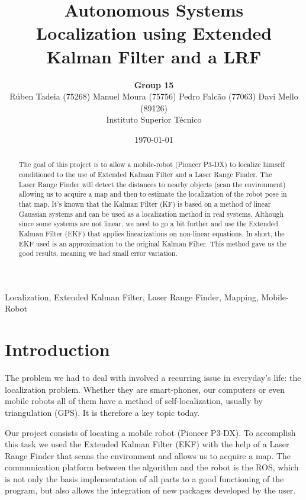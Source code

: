 \documentclass[a4paper]{IEEEtran}
\title{{\normalsize Autonomous Systems} \\
Localization using Extended Kalman Filter and a LRF}
\author{
        \textbf{Group 15}\\
        R\'{u}ben Tadeia (75268)
        \quad
        Manuel Moura (75756)
        \quad
        Pedro Falcão (77063)
        \quad
        Davi Mello (89126) \\
        Instituto Superior T\'{e}cnico}
\date{\today}
\begin{document}
\maketitle
{}  %

\begin{abstract}
  The goal of this project is to allow a mobile-robot (Pioneer P3-DX) to localize himself conditioned to the use of Extended Kalman Filter and a Laser Range Finder. The Laser Range Finder will detect the distances to nearby objects (scan the environment) allowing us to acquire a map and then to estimate the localization of the robot pose in that map. 
It's known that the Kalman Filter (KF) is based on a method of
linear Gaussian systems and can be used as a localization method in real systems. Although since some systems are not linear, we need to go a bit further and use the Extended Kalman Filter (EKF) that applies linearizations on non-linear equations. In short, the EKF used is an approximation to the original Kalman Filter. This method gave us the good results, meaning we had small error variation.

\end{abstract}

\begin{IEEEkeywords}
  Localization, Extended Kalman Filter, Laser Range Finder, Mapping, Mobile-Robot
\end{IEEEkeywords}

\section{Introduction}
\label{sec:introduction}

The problem we had to deal with involved a recurring issue in everyday's life: the localization problem. Whether they are smart-phones, our computers or even mobile robots all of them have a method of self-localization, usually by triangulation (GPS). It is therefore a key topic today. \par
Our project consists of locating a mobile robot (Pioneer P3-DX). To accomplish this task we used the Extended Kalman Filter (EKF) with the help of a Laser Range Finder that scans the environment and allows us to acquire a map. The communication platform between the algorithm and the robot is the ROS, which is not only the basis implementation of all parts to a good functioning of the program, but also allows the integration of new packages developed by the user.\par
\end{document}
